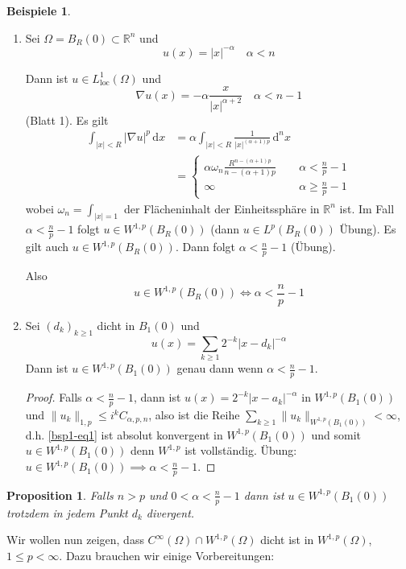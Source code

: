 \documentclass[
paper=a4,
bibtotocnumbered,
liststotocnumbered,
tablecaptionabove,
pointlessnumbers,
twoside,
openright,
10pt
]
{report}
\newtheorem{prop}[thm]{Proposition}
\theoremstyle{definition}
\newtheorem*{bspe}{Beispiele}
\numberwithin{equation}{chapter}
\begin{document}
\begin{bspe}
\begin{enumerate}[1)]
\item Sei $\Omega = B_R(0)\subset \mathbb R^n$ und $$u(x)=|x|^{-\alpha} \quad \alpha <n$$

Dann ist $u\in L_{\text{loc}}^1(\Omega)$ und 
$$\nabla u(x)= - \alpha \frac{x}{|x|^{\alpha+2}} \quad \alpha < n-1$$
(Blatt 1). Es gilt
\begin{align*}
\int_{|x|<R} |\nabla u|^p \, \mathrm dx &= \alpha \int_{|x|<R} \frac{1}{|x|^{(\alpha+1)p}} \, \mathrm d^n x\\
&= \begin{cases}
\alpha \omega_n \frac{R^{n-(\alpha+1)p}}{n-(\alpha+1)p} &\ \quad \alpha < \frac{n}{p} -1\\
\infty &\ \quad \alpha \ge \frac{n}{p} -1
\end{cases}
\end{align*}
wobei $\omega_n = \int_{|x|=1}$ der Flächeninhalt der Einheitssphäre in $\mathbb R^n$ ist. Im Fall $\alpha < \frac{n}{p}-1$ folgt $u\in W^{1,p}(B_R(0))$ (dann $u\in L^p(B_R(0))$ Übung). Es gilt auch $u\in W^{1,p}(B_R(0))$. Dann folgt $\alpha < \frac{n}{p}-1$ (Übung). 

Also
$$
u \in W^{1,p}(B_R(0)) \iff \alpha < \frac{n}{p}-1
$$
\item Sei $(d_k)_{k\ge 1}$ dicht in $B_1(0)$ und 
\begin{equation}\label{bsp1-eq1}
u(x) = \sum_{k\ge 1} 2^{-k} |x-d_k|^{-\alpha}
\end{equation}
Dann ist $u\in W^{1,p}(B_1(0))$ genau dann wenn $\alpha < \frac{n}{p}-1$.
\begin{proof}
Falls $\alpha < \frac{n}{p}-1$, dann ist $u(x)=2^{-k} |x-a_k|^{-\alpha}$ in $W^{1,p}(B_1(0))$ und $\| u_k\|_{1,p} \le i^k C_{\alpha, p,n}$, also ist die Reihe $\sum_{k\ge 1} \| u_k \|_{W^{1,p}(B_1(0))} < \infty$, d.h. \eqref{bsp1-eq1} ist absolut konvergent in $W^{1,p}(B_1(0))$ und somit $u\in W^{1,p}(B_1(0))$ denn $W^{1,p}$ ist vollständig. Übung: $u\in W^{1,p}(B_1(0))\implies \alpha < \frac{n}{p}-1$. 
\end{proof}
\end{enumerate}
\end{bspe}

\begin{prop}
Falls $n>p$ und $0<\alpha < \frac{n}{p}-1$ dann ist $u\in W^{1,p}(B_1(0))$ trotzdem in jedem Punkt $d_k$ divergent.
\end{prop}
Wir wollen nun zeigen, dass $C^\infty(\Omega) \cap W^{1,p}(\Omega)$ dicht ist in $W^{1,p}(\Omega)$, $1\le p <\infty$. Dazu brauchen wir einige Vorbereitungen:
\end{document}
